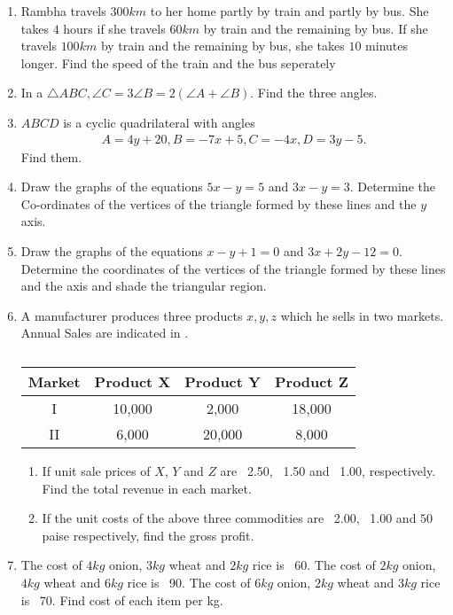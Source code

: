 \begin{enumerate}[label=\thesubsection.\arabic*, ref=\thesubsection.\theenumi]
\item Rambha travels $300 km$ to her home partly by train and partly by bus. She takes $4$ hours if she travels $60km$ by train and the remaining by bus. If she travels $100km$ by train and the remaining by bus,  she takes $10$ minutes longer. Find the speed of the train and the bus seperately
\item In a $\triangle ABC,  \angle C=3 \angle B=2(\angle A+\angle B)$.  Find the three angles. 
\item $ABCD$ is a cyclic quadrilateral 
	with angles
\begin{align}
	A = 4y+20,  B = -7x+5,  C = -4x,  D = 3y-5. 
\end{align}
Find them.  
\item Draw the graphs of the equations $5x-y=5$ and $3x-y=3$.  Determine the Co-ordinates of the vertices of the triangle formed by these lines and the $y$ axis. 
\item Draw the graphs of the equations $x-y+1=0$ and $3x+2y-12=0$.  Determine the coordinates of the vertices of the triangle formed by these lines and the axis and shade the triangular region. 
\item A manufacturer produces three products $x, y, z$ which he sells in two markets. Annual Sales are indicated 
	in .
		\begin{table}[H]
\centering
\begin{tabular}{|c|c|c|c|}
\hline
Market &  Product X & Product Y & Product Z\\
\hline
I &10,000 &2,000 &18,000\\
\hline
II &6,000 &20,000 &8,000\\
\hline
\end{tabular}
\caption{}
	\label{tab:appl-mat}
\end{table}
\begin{enumerate}
\item If unit sale prices of $X$, $Y$ and $Z$ are \rupee~2.50, \rupee~1.50 and \rupee~1.00, respectively. Find the total revenue in each market. 
\item If the unit costs of the above three commodities are \rupee~2.00, \rupee~1.00 and $50$ paise respectively, find the gross profit.
\end{enumerate}
\item The cost of $4 kg$ onion, $3 kg$ wheat and $2 kg$ rice is \rupee~60. The cost of $2 kg$ onion, $4 kg$ wheat and $6 kg$ rice is \rupee~90. The cost of $6 kg$ onion, $2 kg$ wheat and $3 kg$ rice is \rupee~70. Find cost of each item per kg. 

\end{enumerate}
